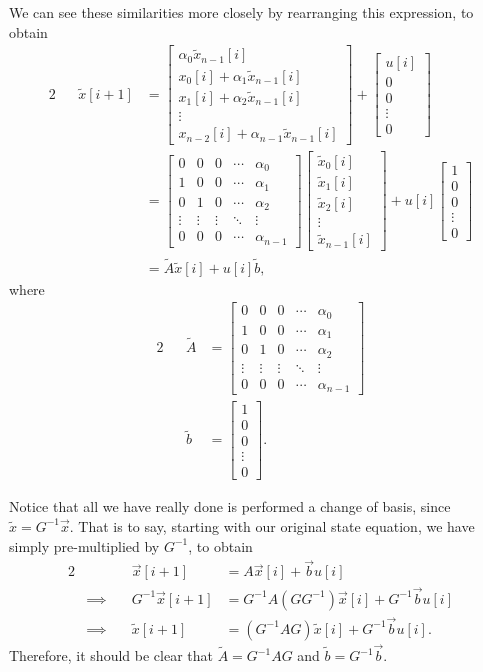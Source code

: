 \documentclass[letterpaper]{article}
\theoremstyle{remark}
\renewcommand{\tilde}[1]{\widetilde{#1}}
\newcommand{\mat}[1]{\ensuremath{\begin{bmatrix}#1\end{bmatrix}}}
\newcommand{\eqn}[1]{\begin{alignat*}{2}#1\end{alignat*}}
\newcommand*{\thus}{&\implies\quad&}
\begin{document}
We can see these similarities more closely by rearranging this expression, to obtain
\eqn{
    && \tilde{x}[i + 1] &= \mat{\alpha_0 \tilde{x}_{n-1}[i] \\ x_0[i] + \alpha_1 \tilde{x}_{n-1}[i] \\ x_1[i] + \alpha_2 \tilde{x}_{n-1}[i] \\ \vdots \\ x_{n-2}[i] + \alpha_{n-1} \tilde{x}_{n-1}[i]} + \mat{u[i] \\ 0 \\ 0 \\ \vdots \\ 0} \\
    &&&= \mat{
    0 & 0 & 0 & \cdots & \alpha_0 \\
    1 & 0 & 0 & \cdots & \alpha_1 \\
    0 & 1 & 0 & \cdots & \alpha_2 \\
    \vdots & \vdots & \vdots & \ddots & \vdots \\
    0 & 0 & 0 & \cdots & \alpha_{n-1}} \mat{\tilde{x}_0[i] \\ \tilde{x}_1[i] \\ \tilde{x}_2[i] \\ \vdots \\ \tilde{x}_{n-1}[i]} + u[i] \mat{1 \\ 0 \\ 0 \\ \vdots \\ 0} \\
    &&&= \tilde{A} \tilde{x}[i] + u[i] \tilde{b},
}
where
\eqn{
    && \tilde{A}  &= \mat{
    0 & 0 & 0 & \cdots & \alpha_0 \\
    1 & 0 & 0 & \cdots & \alpha_1 \\
    0 & 1 & 0 & \cdots & \alpha_2 \\
    \vdots & \vdots & \vdots & \ddots & \vdots \\
    0 & 0 & 0 & \cdots & \alpha_{n-1}}  \\
    && \tilde{b} &= \mat{1 \\ 0 \\ 0 \\ \vdots \\ 0}.
}

Notice that all we have really done is performed a change of basis, since $\tilde{x} = G^{-1}\vec{x}$. That is to say, starting with our original state equation, we have simply pre-multiplied by $G^{-1}$, to obtain
\eqn{
    && \vec{x}[i + 1] &= A\vec{x}[i] + \vec{b} u[i] \\
    \thus G^{-1}\vec{x}[i + 1] &= G^{-1}A(GG^{-1})\vec{x}[i] + G^{-1}\vec{b} u[i] \\
    \thus \tilde{x}[i + 1] &= (G^{-1}AG)\tilde{x}[i] + G^{-1}\vec{b} u[i].
}
Therefore, it should be clear that $\tilde{A} = G^{-1}AG$ and $\tilde{b} = G^{-1}\vec{b}$.
\end{document}
